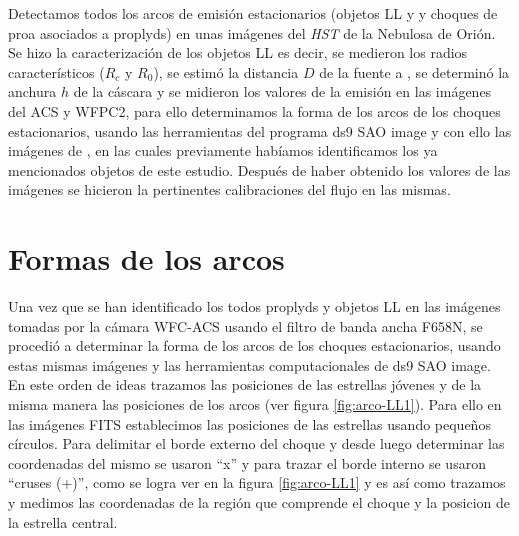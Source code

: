 %



%

\label{chap:methodology}
Detectamos todos los arcos de emisión estacionarios (objetos LL y y choques de proa asociados a proplyds) en unas imágenes del \textit{HST} de la Nebulosa de Orión. Se hizo la caracterización de los objetos LL es decir, se medieron los radios característicos (\(R_{c}\) y \( R_{0}\)), se estimó  la distancia \(D\) de la fuente a \thC{}, se determinó la anchura \(h\) de la cáscara y se  midieron  los valores de la emisión en las imágenes del ACS y WFPC2, para ello determinamos la forma de los arcos de los choques estacionarios, usando las herramientas del programa ds9 SAO image y con ello las imágenes de \citet{Bally:2006a}, en las cuales previamente habíamos identificamos los ya mencionados objetos de este estudio. Después de haber obtenido los valores de las imágenes se hicieron la pertinentes calibraciones del flujo en las mismas.

\section{Formas de los arcos}
\label{sec:arcos}

Una vez que se han identificado los todos proplyds y objetos LL en las imágenes tomadas por la cámara WFC-ACS usando el filtro de banda ancha F658N, se procedió a determinar la forma de los arcos de los choques estacionarios, usando estas mismas imágenes y las herramientas computacionales de ds9 SAO image. En este orden de ideas trazamos las posiciones de las estrellas jóvenes y de la misma manera las posiciones de los arcos (ver figura \ref{fig:arco-LL1}). Para ello en las imágenes FITS  establecimos las posiciones de las estrellas usando pequeños círculos. Para delimitar el borde externo del choque y desde luego determinar las coordenadas del mismo se usaron ``x'' y  para trazar el borde interno se usaron ``cruses (+)'', como se logra ver en la figura \ref{fig:arco-LL1} y es así como trazamos y medimos las coordenadas de la  región que comprende el choque y la posicion de la estrella central. 

